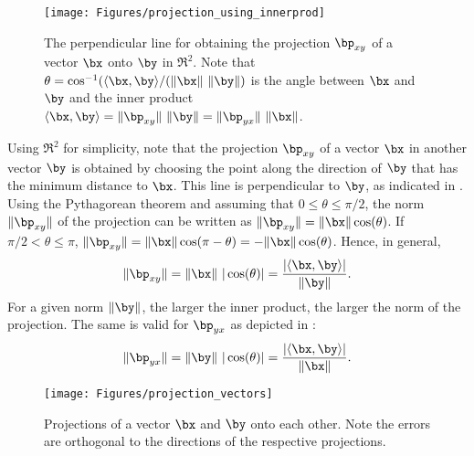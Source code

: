 \begin{figure}[!htb]
        \centering
                \texttt{[image: Figures/projection\_using\_innerprod]}          
        \caption[{The perpendicular line for obtaining the projection $\bp_{xy}$ of a vector $\bx$ onto $\by$ in $\Re^2$.}]{The perpendicular line for obtaining the projection $\bp_{xy}$ of a vector $\bx$ onto $\by$ in $\Re^2$. Note that $\theta = \cos^{-1}(\langle \bx,\by\rangle/(\lVert\bx\rVert~\lVert\by\rVert)$ is the angle between $\bx$ and $\by$ and the inner product $\langle\bx,\by\rangle = \lVert\bp_{xy}\rVert ~\lVert\by\rVert = \lVert\bp_{yx}\rVert ~\lVert\bx\rVert$.\label{fig:projection_using_innerprod}}
\end{figure}

Using $\Re^2$ for simplicity, note that the projection $\bp_{xy}$ of a vector $\bx$ in another vector $\by$ is obtained by choosing the point along the direction of $\by$ that has the minimum distance to $\bx$. This line is perpendicular to $\by$, as indicated in . 
Using the Pythagorean theorem and assuming that $0 \le \theta \le \pi/2$, the norm  
$\lVert\bp_{xy}\rVert$ of the projection can be written as
$\lVert\bp_{xy}\rVert=\lVert\bx\rVert \cos(\theta)$.
If $\pi/2 < \theta \le \pi$, $\lVert\bp_{xy}\rVert=\lVert\bx\rVert \cos(\pi-\theta) = -\lVert\bx\rVert \cos(\theta)$. Hence, in general,
\begin{equation}
\lVert\bp_{xy}\rVert=\lVert\bx\rVert \textrm{~} | \cos(\theta) |
 = \frac{| \langle\bx,\by\rangle |}{\lVert\by\rVert}.
\label{eq:projection_vector}
\end{equation}
For a given norm $\lVert\by\rVert$, the larger the inner product, the larger the norm of the projection. The same is valid for $\bp_{yx}$ as depicted in :
\[
\lVert\bp_{yx}\rVert=
\lVert\by\rVert \textrm{~} | \cos(\theta) |
 = \frac{| \langle\bx,\by\rangle |}{\lVert\bx\rVert}.
\]

\begin{figure}[!htb]
        \centering
                \texttt{[image: Figures/projection\_vectors]}          
        \caption[{Projections of a vector $\bx$ and $\by$ onto each other.}]{Projections of a vector $\bx$ and $\by$ onto each other. Note the errors are orthogonal to the directions of the respective projections.\label{fig:projection_vectors}}
\end{figure}

